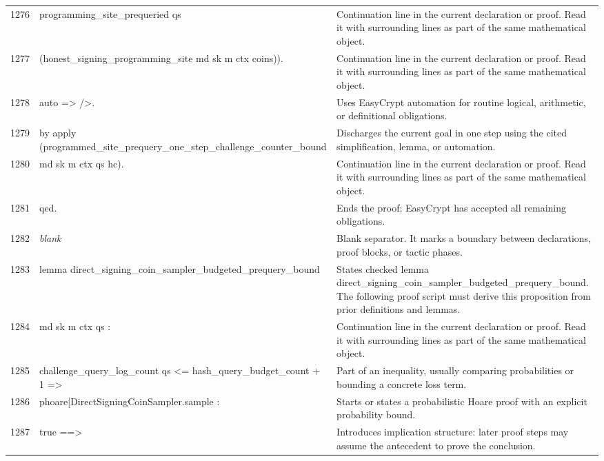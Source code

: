 \documentclass[10pt]{article}
\begin{document}
\begin{longtable}{r L{0.53\textwidth} L{0.37\textwidth}}
1276 & {\ttfamily\scriptsize   programming\_site\_prequeried qs} & Continuation line in the current declaration or proof.  Read it with surrounding lines as part of the same mathematical object. \\
1277 & {\ttfamily\scriptsize     (honest\_signing\_programming\_site md sk m ctx coins)).} & Continuation line in the current declaration or proof.  Read it with surrounding lines as part of the same mathematical object. \\
1278 & {\ttfamily\scriptsize auto => />.} & Uses EasyCrypt automation for routine logical, arithmetic, or definitional obligations. \\
1279 & {\ttfamily\scriptsize by apply (programmed\_site\_prequery\_one\_step\_challenge\_counter\_bound} & Discharges the current goal in one step using the cited simplification, lemma, or automation. \\
1280 & {\ttfamily\scriptsize 	            md sk m ctx qs hc).} & Continuation line in the current declaration or proof.  Read it with surrounding lines as part of the same mathematical object. \\
1281 & {\ttfamily\scriptsize qed.} & Ends the proof; EasyCrypt has accepted all remaining obligations. \\
1282 & {\ttfamily\scriptsize \emph{blank}} & Blank separator.  It marks a boundary between declarations, proof blocks, or tactic phases. \\
1283 & {\ttfamily\scriptsize lemma direct\_signing\_coin\_sampler\_budgeted\_prequery\_bound} & States checked lemma direct\_signing\_coin\_sampler\_budgeted\_prequery\_bound.  The following proof script must derive this proposition from prior definitions and lemmas. \\
1284 & {\ttfamily\scriptsize   md sk m ctx qs :} & Continuation line in the current declaration or proof.  Read it with surrounding lines as part of the same mathematical object. \\
1285 & {\ttfamily\scriptsize   challenge\_query\_log\_count qs <= hash\_query\_budget\_count + 1 =>} & Part of an inequality, usually comparing probabilities or bounding a concrete loss term. \\
1286 & {\ttfamily\scriptsize   phoare[DirectSigningCoinSampler.sample :} & Starts or states a probabilistic Hoare proof with an explicit probability bound. \\
1287 & {\ttfamily\scriptsize     true ==>} & Introduces implication structure: later proof steps may assume the antecedent to prove the conclusion. \\

\end{longtable}
\end{document}
